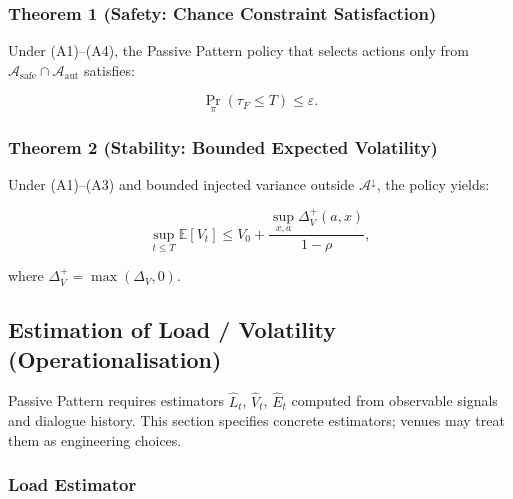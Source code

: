 \subsubsection{Theorem 1 (Safety: Chance Constraint Satisfaction)}
\label{sec:pp-thm-1}

\begin{theorem}
\label{thm:pp-safety}
Under (A1)--(A4), the Passive Pattern policy that selects actions
only from $\mathcal{A}_{\mathrm{safe}} \cap
\mathcal{A}_{\mathrm{aut}}$ satisfies:

\begin{equation}
\Pr_\pi(\tau_F \le T) \le \varepsilon.
\end{equation}
\end{theorem}

\subsubsection{Theorem 2 (Stability: Bounded Expected Volatility)}
\label{sec:pp-thm-2}

\begin{theorem}
\label{thm:pp-stability}
Under (A1)--(A3) and bounded injected variance outside
$\mathcal{A}^{\downarrow}$, the policy yields:

\begin{equation}
\sup_{t \le T} \mathbb{E}[V_t] \le V_0 +
\frac{\sup_{x, a} \Delta_V^+(a, x)}{1 - \rho},
\end{equation}

\noindent
where $\Delta_V^+ = \max(\Delta_V, 0)$.
\end{theorem}

\subsection{Estimation of Load / Volatility (Operationalisation)}
\label{sec:pp-estimation}

Passive Pattern requires estimators $\widehat{L}_t$,
$\widehat{V}_t$, $\widehat{E}_t$ computed from observable signals
and dialogue history. This section specifies concrete estimators;
venues may treat them as engineering choices.

\subsubsection{Load Estimator}
\label{sec:pp-load-estimator}

